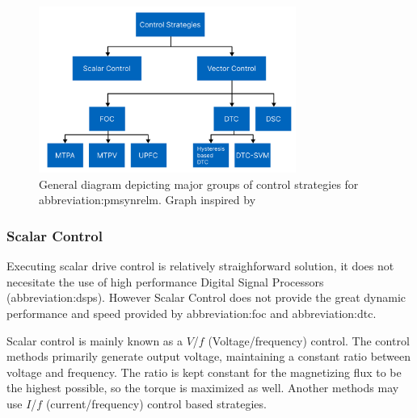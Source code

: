 \documentclass[a4paper, twoside, 11pt]{article}
\begin{document}
        \begin{figure}[htbp!]
            \centering
            \includegraphics[width=0.75\textwidth]{src/png/pmsynrelm-control-strategies.png}
            \caption{General diagram depicting major groups of control strategies for \gls{abbreviation:pmsynrelm}. Graph inspired by \cite{dwivedi-review-on-control-strategies-of-permanent-magnet-assisted-synchronous-reluctance-motor-drive}}
            \label{fig:pmsynrelm-control-strategies}
        \end{figure}


        \subsubsection{Scalar Control}
            Executing scalar drive control is relatively straighforward solution, it does not necesitate the use of high performance Digital Signal Processors (\gls{abbreviation:dsp}s). However Scalar Control does not provide the great dynamic performance and speed provided by \gls{abbreviation:foc} and \gls{abbreviation:dtc}. \cite{dwivedi-review-on-control-strategies-of-permanent-magnet-assisted-synchronous-reluctance-motor-drive}\par
            Scalar control is mainly known as a $V$/$f$ (Voltage/frequency) control. The control methods primarily generate output voltage, maintaining a constant ratio between voltage and frequency. The ratio is kept constant for the magnetizing flux to be the highest possible, so the torque is maximized as well. Another methods may use $I$/$f$ (current/frequency) control based strategies. \cite{heidari-a-review-of-synchronour-relucatence-motor-drive-advancements}
\end{document}
